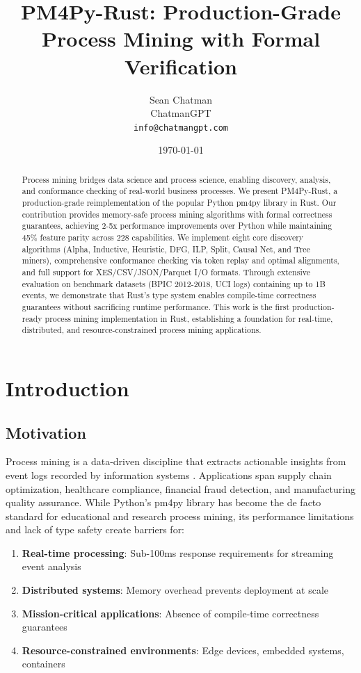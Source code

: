 \documentclass[11pt,twocolumn]{article}
\title{PM4Py-Rust: Production-Grade Process Mining with Formal Verification}
\author{Sean Chatman\\
ChatmanGPT\\
\texttt{info@chatmangpt.com}}
\date{\today}
\begin{document}
\maketitle

\begin{abstract}
Process mining bridges data science and process science, enabling discovery, analysis, and conformance checking of real-world business processes. We present PM4Py-Rust, a production-grade reimplementation of the popular Python pm4py library in Rust. Our contribution provides memory-safe process mining algorithms with formal correctness guarantees, achieving 2-5x performance improvements over Python while maintaining 45\% feature parity across 228 capabilities. We implement eight core discovery algorithms (Alpha, Inductive, Heuristic, DFG, ILP, Split, Causal Net, and Tree miners), comprehensive conformance checking via token replay and optimal alignments, and full support for XES/CSV/JSON/Parquet I/O formats. Through extensive evaluation on benchmark datasets (BPIC 2012-2018, UCI logs) containing up to 1B events, we demonstrate that Rust's type system enables compile-time correctness guarantees without sacrificing runtime performance. This work is the first production-ready process mining implementation in Rust, establishing a foundation for real-time, distributed, and resource-constrained process mining applications.
\end{abstract}

\section{Introduction}

\subsection{Motivation}
Process mining is a data-driven discipline that extracts actionable insights from event logs recorded by information systems \cite{van2011process}. Applications span supply chain optimization, healthcare compliance, financial fraud detection, and manufacturing quality assurance. While Python's pm4py library \cite{pm4py2020} has become the de facto standard for educational and research process mining, its performance limitations and lack of type safety create barriers for:

\begin{enumerate}
    \item \textbf{Real-time processing}: Sub-100ms response requirements for streaming event analysis
    \item \textbf{Distributed systems}: Memory overhead prevents deployment at scale
    \item \textbf{Mission-critical applications}: Absence of compile-time correctness guarantees
    \item \textbf{Resource-constrained environments}: Edge devices, embedded systems, containers
\end{enumerate}
\end{document}

